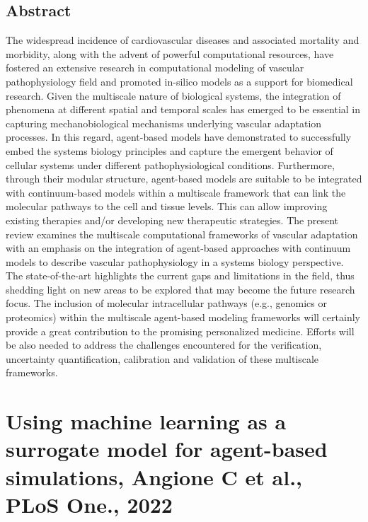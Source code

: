 \documentclass[11pt,a4paper]{article}
\begin{document}
\subsection*{Abstract}
The widespread incidence of cardiovascular diseases and associated mortality and morbidity, along with the advent of powerful computational resources, have fostered an extensive research in computational modeling of vascular pathophysiology field and promoted in-silico models as a support for biomedical research. Given the multiscale nature of biological systems, the integration of phenomena at different spatial and temporal scales has emerged to be essential in capturing mechanobiological mechanisms underlying vascular adaptation processes. In this regard, agent-based models have demonstrated to successfully embed the systems biology principles and capture the emergent behavior of cellular systems under different pathophysiological conditions. Furthermore, through their modular structure, agent-based models are suitable to be integrated with continuum-based models within a multiscale framework that can link the molecular pathways to the cell and tissue levels. This can allow improving existing therapies and/or developing new therapeutic strategies. The present review examines the multiscale computational frameworks of vascular adaptation with an emphasis on the integration of agent-based approaches with continuum models to describe vascular pathophysiology in a systems biology perspective. The state-of-the-art highlights the current gaps and limitations in the field, thus shedding light on new areas to be explored that may become the future research focus. The inclusion of molecular intracellular pathways (e.g., genomics or proteomics) within the multiscale agent-based modeling frameworks will certainly provide a great contribution to the promising personalized medicine. Efforts will be also needed to address the challenges encountered for the verification, uncertainty quantification, calibration and validation of these multiscale frameworks.

\section*{Using machine learning as a surrogate model for agent-based simulations, Angione C et al., PLoS One., 2022}
\end{document}
